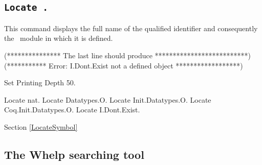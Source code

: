 

\subsection[\tt Locate {\qualid}.]{\tt Locate {\qualid}.
\label{Locate}}
This command displays the full name of the qualified identifier {\qualid}
and consequently the \Coq\ module in which it is defined.

\begin{coq_eval}
(*************** The last line should produce **************************)
(*********** Error: I.Dont.Exist not a defined object ******************)
\end{coq_eval}
\begin{coq_eval}
Set Printing Depth 50.
\end{coq_eval}
\begin{coq_example}
Locate nat.
Locate Datatypes.O.
Locate Init.Datatypes.O.
Locate Coq.Init.Datatypes.O.
Locate I.Dont.Exist.
\end{coq_example}

\SeeAlso Section \ref{LocateSymbol}

\subsection{The {\sc Whelp} searching tool
\label{Whelp}}

